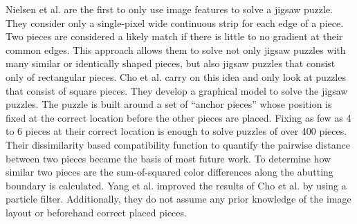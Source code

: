 \documentclass[11pt]{report}
\begin{document}
Nielsen et al. \cite{nielsen2008solving} are the first to only use image
features to solve a jigsaw puzzle. They consider only a single-pixel wide
continuous strip for each edge of a piece. Two pieces are considered a likely
match if there is little to no gradient at their common edges. This approach
allows them to solve not only jigsaw puzzles with many similar or identically shaped
pieces, but also jigsaw puzzles that consist only of rectangular pieces. Cho et
al. \cite{Cho2010} carry on this idea and only look at puzzles that consist of
square pieces. They develop a graphical model to solve the jigsaw puzzles. The
puzzle is built around a set of ``anchor pieces'' whose position is fixed at the
correct location before the other pieces are placed. Fixing
as few as 4 to 6 pieces at their correct location is enough to solve puzzles of
over 400 pieces. Their dissimilarity based
compatibility function to quantify the pairwise distance between two pieces
became the basis of most future work. To determine how similar two pieces are
the sum-of-squared color differences along the abutting boundary is calculated.
Yang et al. \cite{yang2011particle} improved the results of Cho et al.
\cite{Cho2010} by using a particle filter. Additionally, they do not assume any
prior knowledge of the image layout or beforehand correct placed pieces.
\end{document}
